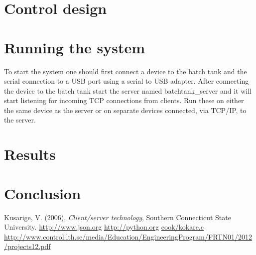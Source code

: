 \documentclass{article}
\begin{document}
\section{Control design}


\section{Running the system}
To start the system one should first connect a device to the batch tank and the serial connection to a USB port using a serial to USB adapter. After connecting the device to the batch tank start the server named batchtank\_server and it will start listening for incoming TCP connections from clients. Run these on either the same device as the server or on separate devices connected, via TCP/IP, to the server.

\section{Results}

\section{Conclusion}

\newpage

\begin{thebibliography}{9}
Kusarige, V. (2006), \emph{Client/server technology}, Southern Connecticut State University.
\url{http://www.json.org}
\url{http://python.org}
\url{cook/kokare.c}
\url{http://www.control.lth.se/media/Education/EngineeringProgram/FRTN01/2012/projects12.pdf}
\end{thebibliography}
\end{document}
